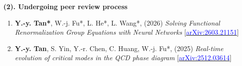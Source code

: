 \documentclass[11pt,a4paper]{article}
\begin{document}
\large{\textbf{(2). Undergoing peer review process}}
\normalsize\vspace{1ex}


\begin{enumerate}
\item \textbf{Y.-y. Tan*}, W.-j. Fu*, L. He*, L. Wang*, (2026) \textit{Solving Functional Renormalization Group Equations with Neural Networks} [\href{https://arxiv.org/abs/2603.21151}{\textcolor{blue}{arXiv:2603.21151}}]

\item \textbf{Y.-y. Tan}, S. Yin, Y.-r. Chen, C. Huang, W.-j. Fu*, (2025) \textit{Real-time evolution of critical modes in the QCD phase diagram} [\href{https://arxiv.org/abs/2512.03614}{\textcolor{blue}{arXiv:2512.03614}}]

\end{enumerate}





\vspace{1cm}
\end{document}
